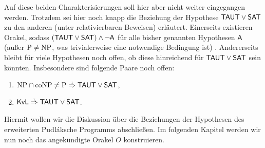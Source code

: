 \begin{itemize}[parsep=0pt,listparindent=\parindent,itemsep=5pt plus 1pt minus 1pt,midpenalty=0]
        Auf diese beiden Charakterisierungen soll hier aber nicht weiter eingegangen werden.
        Trotzdem sei hier noch knapp die Beziehung der Hypothese $\mathsf{TAUT}\lor\mathsf{SAT}$ zu den anderen (unter relativierbaren Beweisen) erläutert.
        Einerseits existieren Orakel, sodass $(\mathsf{TAUT}\lor\mathsf{SAT})\land \neg\mathsf{A}$ für alle bisher genannten Hypothesen $\mathsf A$ (außer $\mathrm{P}\neq\mathrm{NP}$, was trivialerweise eine notwendige Bedingung ist) . Andererseits bleibt für viele Hypothesen noch offen, ob diese hinreichend für $\mathsf{TAUT}\lor\mathsf{SAT}$ sein könnten. Insbesondere sind folgende Paare noch offen:
        \begin{enumerate}[noitemsep,resume,label=(\roman*)]
            \item $\NP\cap\coNP\neq \P\stackrel{\smash{\text{\raisebox{-1pt}{\tiny ?}}}}{\Rightarrow}\hTAUT\lor\hSAT$,
            \item $\mathsf{KvL}\stackrel{\smash{\text{\raisebox{-1pt}{\tiny ?}}}}{\Rightarrow}\hTAUT\lor\hSAT$.
        \end{enumerate}
\end{itemize}

Hiermit wollen wir die Diskussion über die Beziehungen der Hypothesen des erweiterten Pudláksche Programms abschließen. Im folgenden Kapitel werden wir nun noch das angekündigte Orakel $O$ konstruieren.

